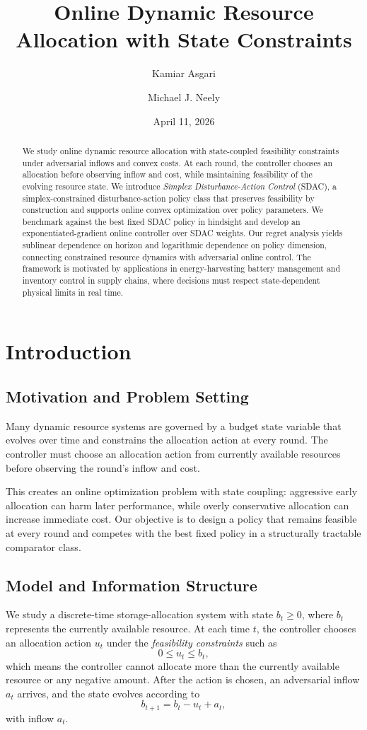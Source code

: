 \documentclass[11pt]{article}
\title{Online Dynamic Resource Allocation with State Constraints}
\author{Kamiar Asgari \and Michael J. Neely}
\date{April 11, 2026}
\begin{document}
\maketitle

\begin{abstract}
We study online dynamic resource allocation with state-coupled feasibility constraints under adversarial inflows and convex costs. At each round, the controller chooses an allocation before observing inflow and cost, while maintaining feasibility of the evolving resource state. We introduce \emph{Simplex Disturbance-Action Control} (SDAC), a simplex-constrained disturbance-action policy class that preserves feasibility by construction and supports online convex optimization over policy parameters. We benchmark against the best fixed SDAC policy in hindsight and develop an exponentiated-gradient online controller over SDAC weights. Our regret analysis yields sublinear dependence on horizon and logarithmic dependence on policy dimension, connecting constrained resource dynamics with adversarial online control.
The framework is motivated by applications in energy-harvesting battery management and inventory control in supply chains, where decisions must respect state-dependent physical limits in real time.
\end{abstract}

\section{Introduction}
\label{sec:introduction}

\subsection{Motivation and Problem Setting}
Many dynamic resource systems are governed by a budget state variable that evolves over time and constrains the allocation action at every round. The controller must choose an allocation action from currently available resources before observing the round's inflow and cost.

This creates an online optimization problem with state coupling: aggressive early allocation can harm later performance, while overly conservative allocation can increase immediate cost. Our objective is to design a policy that remains feasible at every round and competes with the best fixed policy in a structurally tractable comparator class.

\subsection{Model and Information Structure}
We study a discrete-time storage-allocation system with state $b_t \geq 0$, where $b_t$ represents the currently available resource. At each time $t$, the controller chooses an allocation action $u_t$ under the \emph{feasibility constraints} such as
\[
0 \leq u_t \leq b_t,
\]
which means the controller cannot allocate more than the currently available resource or any negative amount. After the action is chosen, an adversarial inflow $a_t$ arrives, and the state evolves according to
\[
b_{t+1} = b_t - u_t + a_t,
\]
with inflow $a_t$.
\end{document}
